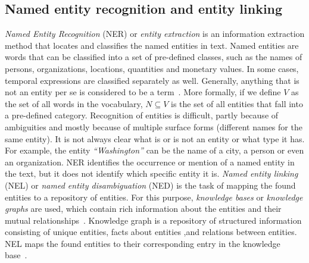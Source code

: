 \subsection{Named entity recognition and  entity linking}\label{subsec:entity_recog}
\emph{Named Entity Recognition} (NER)  or \emph{entity extraction} is an information extraction method that locates and classifies the named entities in text. Named entities are words that can be classified into a set of pre-defined classes, such as the names of persons, organizations, locations, quantities and monetary values. In some cases, temporal expressions are classified separately as well. Generally, anything that is not an entity per se is considered to be a term~. More formally, if we define $V$ as the set of all words in the vocabulary, $N\subseteq V$ is the set of all entities that fall into a pre-defined category.
Recognition of entities is difficult, partly because of ambiguities and mostly because of multiple surface forms (different names for the same entity).
It is not always clear what is or is not an entity or what type it has. For example, the entity \emph{``Washington''} can be the name of a city, a person or even an organization. NER identifies the occurrence or mention of a named entity in the text, but it does not identify which specific entity it is. \emph{Named entity linking} (NEL) or \emph{named entity disambiguation} (NED) is the task of mapping the found entities to a repository of entities. For this purpose, \emph{knowledge bases} or \emph{knowledge graphs} are used, which contain rich information about the entities and their mutual relationships~. Knowledge graph is a repository of structured information consisting of unique entities, facts about entities ,and relations between entities. NEL maps the found entities to their corresponding entry in the knowledge base~. 
